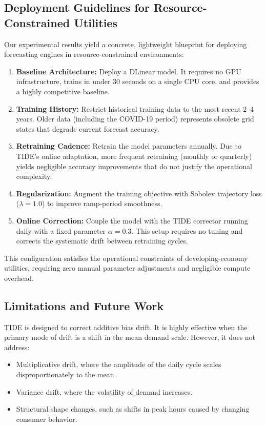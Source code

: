 \documentclass[11pt,letterpaper]{article}
\begin{document}
\subsection{Deployment Guidelines for Resource-Constrained Utilities}
Our experimental results yield a concrete, lightweight blueprint for deploying forecasting engines in resource-constrained environments:
\begin{enumerate}
    \item \textbf{Baseline Architecture:} Deploy a DLinear model. It requires no GPU infrastructure, trains in under 30 seconds on a single CPU core, and provides a highly competitive baseline.
    \item \textbf{Training History:} Restrict historical training data to the most recent 2--4 years. Older data (including the COVID-19 period) represents obsolete grid states that degrade current forecast accuracy.
    \item \textbf{Retraining Cadence:} Retrain the model parameters annually. Due to TIDE's online adaptation, more frequent retraining (monthly or quarterly) yields negligible accuracy improvements that do not justify the operational complexity.
    \item \textbf{Regularization:} Augment the training objective with Sobolev trajectory loss ($\lambda = 1.0$) to improve ramp-period smoothness.
    \item \textbf{Online Correction:} Couple the model with the TIDE corrector running daily with a fixed parameter $\alpha = 0.3$. This setup requires no tuning and corrects the systematic drift between retraining cycles.
\end{enumerate}

This configuration satisfies the operational constraints of developing-economy utilities, requiring zero manual parameter adjustments and negligible compute overhead.

\subsection{Limitations and Future Work}
TIDE is designed to correct additive bias drift. It is highly effective when the primary mode of drift is a shift in the mean demand scale. However, it does not address:
\begin{itemize}
    \item Multiplicative drift, where the amplitude of the daily cycle scales disproportionately to the mean.
    \item Variance drift, where the volatility of demand increases.
    \item Structural shape changes, such as shifts in peak hours caused by changing consumer behavior.
\end{itemize}
\end{document}
